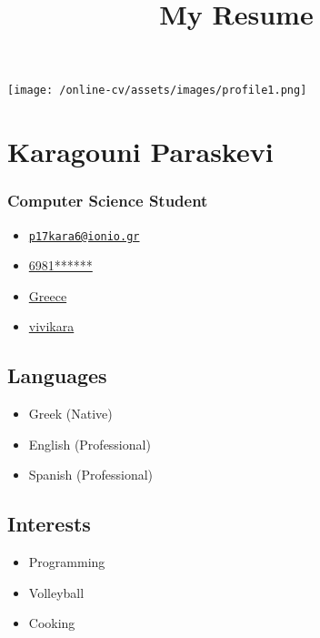 \documentclass[
]{article}
\title{My Resume}
\author{}
\date{}
\providecommand{\tightlist}{%
  \setlength{\itemsep}{0pt}\setlength{\parskip}{0pt}}
\begin{document}
\maketitle

\texttt{[image: /online-cv/assets/images/profile1.png]}

\hypertarget{karagouni-paraskevi}{%
\section{Karagouni Paraskevi}\label{karagouni-paraskevi}}

\hypertarget{computer-science-student}{%
\subsubsection{Computer Science
Student}\label{computer-science-student}}

\begin{itemize}
\tightlist
\item
  \emph{} \href{mailto:p17kara6@ionio.gr}{\nolinkurl{p17kara6@ionio.gr}}
\item
  \emph{} \href{tel:6981******}{6981******}
\item
  \emph{} \href{}{Greece}
\item
  \emph{} \href{http://github.com/vivikara}{vivikara}
\end{itemize}

\hypertarget{languages}{%
\subsection{Languages}\label{languages}}

\begin{itemize}
\tightlist
\item
  Greek {(Native)}
\item
  English {(Professional)}
\item
  Spanish {(Professional)}
\end{itemize}

\hypertarget{interests}{%
\subsection{Interests}\label{interests}}

\begin{itemize}
\tightlist
\item
  Programming
\item
  Volleyball
\item
  Cooking
\end{itemize}
\end{document}
